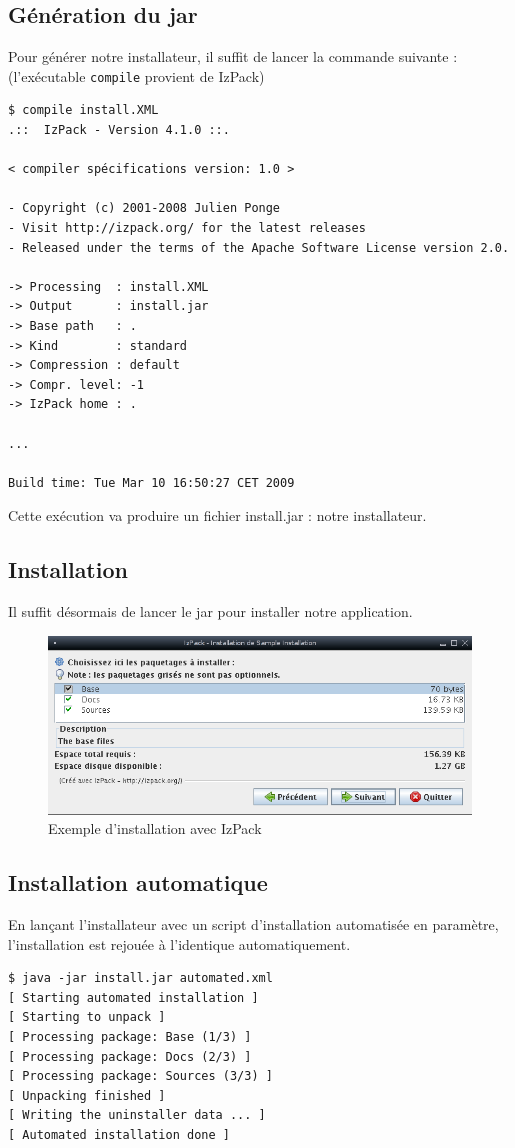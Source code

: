 \subsection{Génération du jar}
Pour générer notre installateur, il suffit de lancer la commande suivante : (l'exécutable \verb|compile| provient de IzPack)
\begin{verbatim}
$ compile install.XML
.::  IzPack - Version 4.1.0 ::.

< compiler spécifications version: 1.0 >

- Copyright (c) 2001-2008 Julien Ponge
- Visit http://izpack.org/ for the latest releases
- Released under the terms of the Apache Software License version 2.0.

-> Processing  : install.XML
-> Output      : install.jar
-> Base path   : .
-> Kind        : standard
-> Compression : default
-> Compr. level: -1
-> IzPack home : .

...

Build time: Tue Mar 10 16:50:27 CET 2009
\end{verbatim}
Cette exécution va produire un fichier install.jar : notre installateur.
\subsection{Installation}
Il suffit désormais de lancer le jar pour installer notre application.
\begin{figure}[H]
	\centering
	\includegraphics[width=15cm]{../image/installSample.png}
	\caption{Exemple d'installation avec IzPack}
\end{figure}

\subsection{Installation automatique}
En lançant l'installateur avec un script d'installation automatisée en paramètre, l'installation est rejouée à l'identique automatiquement.
\begin{verbatim}
$ java -jar install.jar automated.xml
[ Starting automated installation ]
[ Starting to unpack ]
[ Processing package: Base (1/3) ]
[ Processing package: Docs (2/3) ]
[ Processing package: Sources (3/3) ]
[ Unpacking finished ]
[ Writing the uninstaller data ... ]
[ Automated installation done ]
\end{verbatim}

